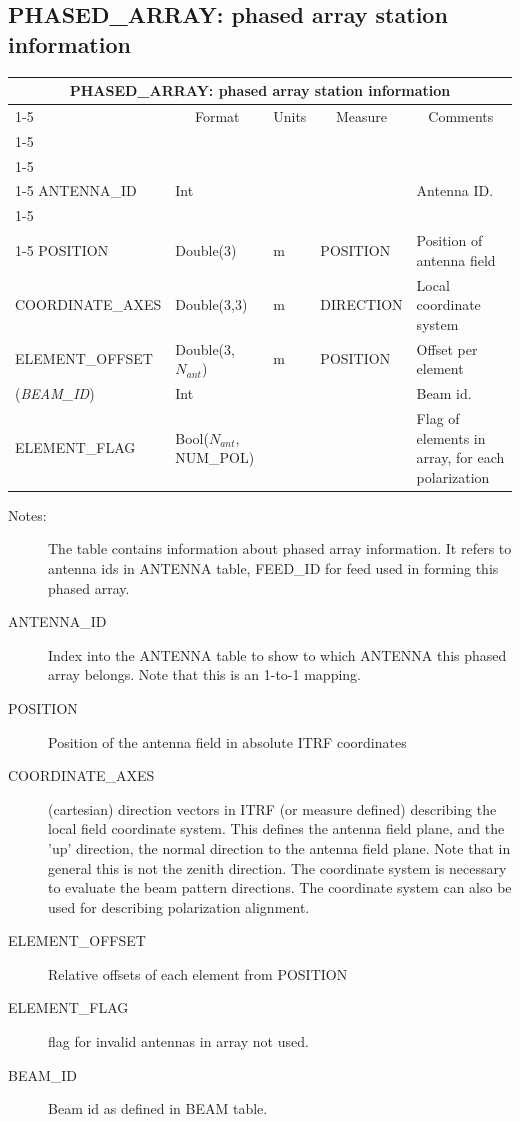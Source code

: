 \documentclass{article}
\newcommand{\na}{$N_{ant}$}
\newcommand{\defline}[1]{\cline{1-5}
\multicolumn{5}{|l|}{#1} \\
\cline{1-5}}
\newcommand{\definetable}[2]
{
	\vfill\newpage
	\subsection{#1}
        \vspace{0.15in}
        \small
	\begin{tabular}{|l|p{1.25in}|l|p{.9in}|p{1.4in}|}
	\hline
	\multicolumn{5}{|c|}{\bf #1}\\ 
	\cline{1-5}
        \multicolumn{1}{|c|}{Name}&\multicolumn{1}{|c|}{Format}&
        \multicolumn{1}{|c|}{Units}&\multicolumn{1}{|c|}{Measure}&
        \multicolumn{1}{|c|}{Comments}\\
        \cline{1-5}
        #2
        \hline
	\end{tabular}
}
\begin{document}
\definetable{PHASED\_ARRAY: phased array station information}{
\defline{\bf Columns}
\defline{\em Key}
ANTENNA\_ID & Int & & & Antenna ID. \\
\defline{\em Data}
POSITION & Double(3) & m & POSITION & Position of antenna field \\
COORDINATE\_AXES & Double(3,3) & m & DIRECTION & Local coordinate system \\
ELEMENT\_OFFSET & Double(3, \na) & m & POSITION & Offset per element \\
({\it BEAM\_ID}) & Int &  &  & Beam id.\\
ELEMENT\_FLAG & Bool(\na, NUM\_POL) &  & & Flag of elements in array, for each polarization\\
}
\begin{description}

\item[Notes:] The table contains information about phased array information. It refers to antenna ids in ANTENNA table, FEED\_ID for feed  used in forming this phased array.  

\item[ANTENNA\_ID] Index into the ANTENNA table to show to which ANTENNA this phased array belongs. Note that this is an 1-to-1 mapping.

\item[POSITION] Position of the antenna field in absolute ITRF coordinates

\item[COORDINATE\_AXES] (cartesian) direction vectors in ITRF (or measure defined) describing the
local field coordinate system. This defines the antenna field plane, and the 'up' direction, the normal direction to the antenna field plane. Note that in general this is not the zenith direction. The coordinate system is necessary to evaluate the beam pattern directions. The coordinate system can also be used for describing polarization alignment.  

\item[ELEMENT\_OFFSET] Relative offsets of each element from POSITION

\item[ELEMENT\_FLAG] flag for invalid antennas in array not used.

\item[BEAM\_ID] Beam id as defined in BEAM table. 


\end{description}
\end{document}
